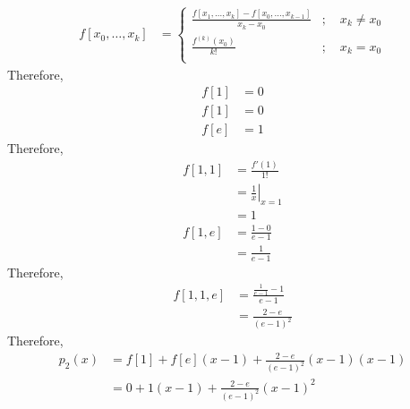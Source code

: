 \documentclass[fleqn, a4paper, 12pt, twoside]{article}
\theoremstyle{definition}
\theoremstyle{theorem}
\begin{document}
\begin{solution}
	\begin{align*}
		f[x_0,\dots,x_k] &=
			\begin{cases}
				\frac{f[x_1,\dots,x_k] - f[x_0,\dots,x_{k - 1}]}{x_k - x_0} & ;\quad x_k \neq x_0 \\
				\frac{f^{(k)}(x_0)}{k!}                                     & ;\quad x_k = x_0    \\
			\end{cases}
	\end{align*}
	Therefore,
	\begin{align*}
		f[1] & = 0 \\
		f[1] & = 0 \\
		f[e] & = 1
	\end{align*}
	Therefore,
	\begin{align*}
		f[1,1] & = \frac{f'(1)}{1!}                   \\
                       & = \left. \frac{1}{x} \right|_{x = 1} \\
                       & = 1                                  \\
		f[1,e] & = \frac{1 - 0}{e - 1}                \\
                       & = \frac{1}{e - 1}
	\end{align*}
	Therefore,
	\begin{align*}
		f[1,1,e] & = \frac{\frac{1}{e - 1} - 1}{e - 1} \\
                         & = \frac{2 - e}{(e - 1)^2}
	\end{align*}
	Therefore,
	\begin{align*}
		p_2(x) & = f[1] + f[e] (x - 1) + \frac{2 - e}{(e - 1)^2} (x - 1) (x - 1) \\
                       & = 0 + 1 (x - 1) + \frac{2 - e}{(e - 1)^2} (x - 1)^2
	\end{align*}
\end{solution}
\end{document}
